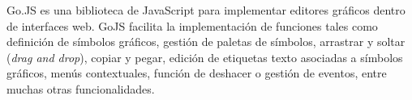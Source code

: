 	 		
Go.JS \cite{gojs} es una biblioteca de JavaScript para implementar editores gráficos dentro de interfaces web. GoJS facilita la implementación de funciones tales como definición de símbolos gráficos, gestión de paletas de símbolos, arrastrar y soltar (\emph{drag and drop}), copiar y pegar, edición de etiquetas texto asociadas a símbolos gráficos, menús contextuales, función de deshacer o gestión de eventos, entre muchas otras funcionalidades.
	 		
